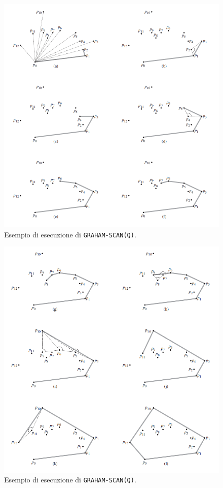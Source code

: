 \documentclass[12pt,a4paper]{report}
\begin{document}
\begin{figure}[ht]
    \centering
    \includegraphics[width=1\linewidth]{ImmaginiGraham.png}
    \caption{Esempio di esecuzione di \texttt{GRAHAM-SCAN(Q)}.}
    \label{fig:immGraham1}
\end{figure}

\pagebreak

\begin{figure}[ht]
    \centering
    \includegraphics[width=1\linewidth]{ImmaginiGraham2.png}
    \caption{Esempio di esecuzione di \texttt{GRAHAM-SCAN(Q)}.}
    \label{fig:immGraham2}
\end{figure}
\end{document}
